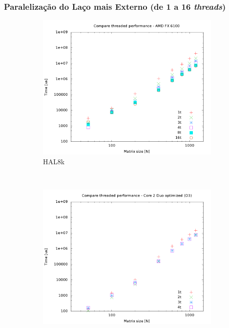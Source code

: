 \documentclass[a4paper, 12pt]{article}
\begin{document}
\subsubsection{Paralelização do Laço mais Externo (de 1 a 16 \textit{threads})}
\begin{figure}[H]
    \centering
    \begin{subfigure}[H]{0.5\textwidth}
        \includegraphics[width=\textwidth]{HAL_par_threads}
        \caption{HAL8k}
        \label{fig:8k_par_threads}
    \end{subfigure}%
    ~ %
    \begin{subfigure}[H]{0.5\textwidth}
        \includegraphics[width=\textwidth]{hpops2_O3_par_threads}

\end{subfigure}
\end{figure}
\end{document}
